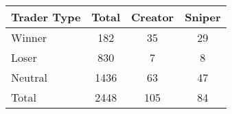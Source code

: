 \begin{tabular}{lccc}
\toprule
Trader Type & Total & Creator & Sniper \\
\midrule
Winner & 182 &  35 & 29 \\
Loser & 830 &  7 & 8 \\
Neutral & 1436 &  63 & 47 \\
\midrule
Total & 2448 &  105 & 84 \\
\bottomrule
\end{tabular}